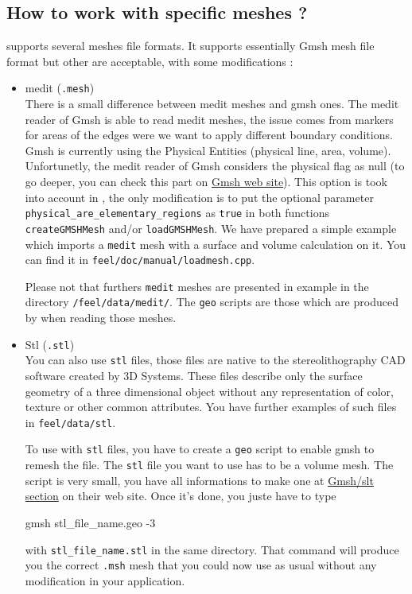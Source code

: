 %

\subsection{How to work with specific meshes ?}
\label{howto:spec-meshes}
\feel supports several meshes file formats. It supports essentially Gmsh mesh file format but other are acceptable,  with some modifications :
\begin{itemize}

\item medit (\lstinline!.mesh!) \\
There is a small difference between medit meshes and gmsh ones. The medit reader of Gmsh is able to read medit meshes, the issue comes from markers for areas of the edges were we want to apply different boundary conditions. Gmsh is currently using the Physical Entities (physical line, area, volume). Unfortunetly, the medit reader of Gmsh considers the physical flag as null (to go deeper, you can check this part on \href{http://geuz.org/gmsh/doc/texinfo/gmsh.html#Elementary-vs-physical-entities}{Gmsh web site}). This option is took into account in \feel, the only modification is to put the optional parameter \lstinline!physical_are_elementary_regions! as \lstinline!true! in both functions \lstinline!createGMSHMesh! and/or \lstinline!loadGMSHMesh!. We have prepared a simple example which imports a \lstinline!medit! mesh with a surface and volume calculation on it. You can find it in \lstinline!feel/doc/manual/loadmesh.cpp!.

Please not that furthers \lstinline!medit! meshes are presented in example in the directory \lstinline!/feel/data/medit/!. The \lstinline!geo! scripts are those which are produced by \feel when reading those meshes.

\item Stl (\lstinline!.stl!) \\
You can also use \lstinline!stl! files, those files are native to the stereolithography CAD software created by 3D Systems. These files describe only the surface geometry of a three dimensional object without any representation of color, texture or other common attributes. You have further examples of such files in \lstinline!feel/data/stl!. 

To use \feel with \lstinline!stl! files, you have to create a \lstinline!geo! script to enable gmsh to remesh the file. The \lstinline!stl! file you want to use has to be a volume mesh. The script is very small, you have all informations to make one at \href{https://geuz.org/trac/gmsh/wiki/STLRemeshing}{Gmsh/slt section} on their web site. Once it's done, you juste have to type
\begin{unixcom}
		gmsh stl_file_name.geo -3
\end{unixcom} 
with \lstinline!stl_file_name.stl! in the same directory. That command will produce you the correct \lstinline!.msh! mesh that you could now use as usual without any modification in your \feel application.


\end{itemize}
